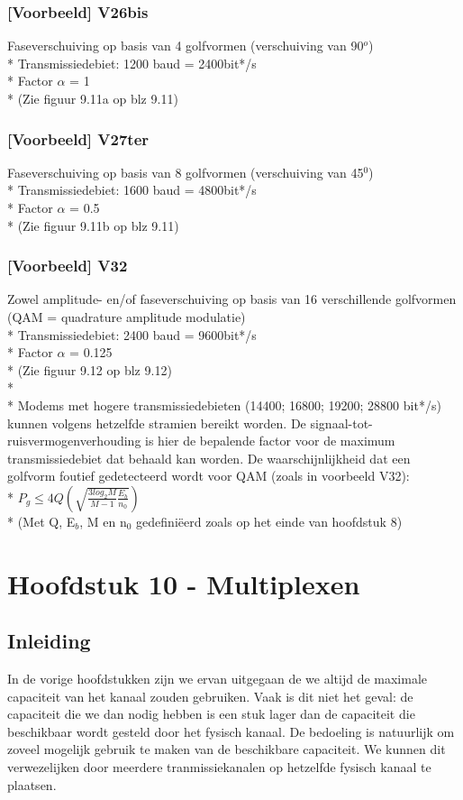 \documentclass[10pt]{article}
\begin{document}
\subsubsection{[Voorbeeld] V26bis}
Faseverschuiving op basis van 4 golfvormen (verschuiving van 90$^o$)\\*
Transmissiedebiet: 1200 baud = 2400bit*/s\\*
Factor $\alpha$ = 1\\*
{\scriptsize (Zie figuur 9.11a op blz 9.11)}
\subsubsection{[Voorbeeld] V27ter}
Faseverschuiving op basis van 8 golfvormen (verschuiving van 45$^0$)\\*
Transmissiedebiet: 1600 baud = 4800bit*/s\\*
Factor $\alpha$ = 0.5\\*
{\scriptsize (Zie figuur 9.11b op blz 9.11)}
\subsubsection{[Voorbeeld] V32}
Zowel amplitude- en/of faseverschuiving op basis van 16 verschillende golfvormen (QAM = quadrature amplitude modulatie)\\*
Transmissiedebiet: 2400 baud = 9600bit*/s\\*
Factor $\alpha$ = 0.125\\*
{\scriptsize (Zie figuur 9.12 op blz 9.12)}\\*\\*
Modems met hogere transmissiedebieten (14400; 16800; 19200; 28800 bit*/s) kunnen volgens hetzelfde stramien bereikt worden. De signaal-tot-ruisvermogenverhouding is hier de bepalende factor voor de maximum transmissiedebiet dat behaald kan worden. De waarschijnlijkheid dat een golfvorm foutief gedetecteerd wordt voor QAM (zoals in voorbeeld V32):\\*
$P_g \leq 4Q\left(\sqrt{\frac{3log_2{M}}{M-1}\frac{E_b}{n_0}}\right)$\\*
{\scriptsize (Met Q, E$_b$, M en n$_0$ gedefini\"eerd zoals op het einde van hoofdstuk 8)}
\section{Hoofdstuk 10 - Multiplexen}
\subsection{Inleiding}
In de vorige hoofdstukken zijn we ervan uitgegaan de we altijd de maximale capaciteit van het kanaal zouden gebruiken. Vaak is dit niet het geval: de capaciteit die we dan nodig hebben is een stuk lager dan de capaciteit die beschikbaar wordt gesteld door het fysisch kanaal. De bedoeling is natuurlijk om zoveel mogelijk gebruik te maken van de beschikbare capaciteit. We kunnen dit verwezelijken door meerdere tranmissiekanalen op hetzelfde fysisch kanaal te plaatsen.
\end{document}
